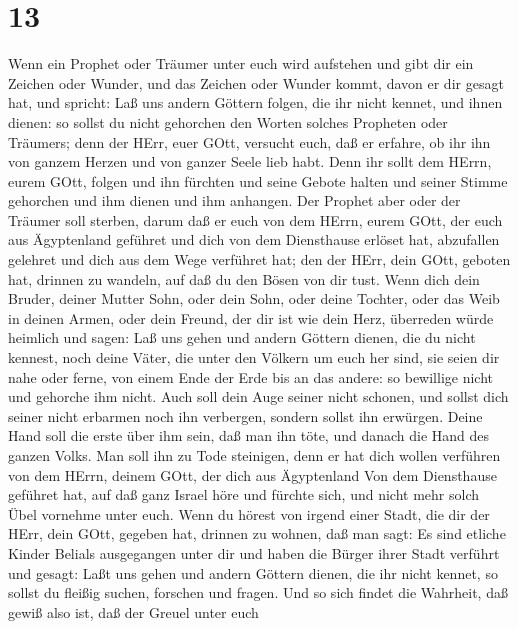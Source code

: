 \hypertarget{section-12}{%
\section{13}\label{section-12}}

 Wenn ein Prophet oder Träumer unter euch wird aufstehen und
gibt dir ein Zeichen oder Wunder,  und das Zeichen oder
Wunder kommt, davon er dir gesagt hat, und spricht: Laß uns andern
Göttern folgen, die ihr nicht kennet, und ihnen dienen:  so
sollst du nicht gehorchen den Worten solches Propheten oder Träumers;
denn der HErr, euer GOtt, versucht euch, daß er erfahre, ob ihr ihn von
ganzem Herzen und von ganzer Seele lieb habt.  Denn ihr
sollt dem HErrn, eurem GOtt, folgen und ihn fürchten und seine Gebote
halten und seiner Stimme gehorchen und ihm dienen und ihm anhangen.
 Der Prophet aber oder der Träumer soll sterben, darum daß
er euch von dem HErrn, eurem GOtt, der euch aus Ägyptenland geführet und
dich von dem Diensthause erlöset hat, abzufallen gelehret und dich aus
dem Wege verführet hat; den der HErr, dein GOtt, geboten hat, drinnen zu
wandeln, auf daß du den Bösen von dir tust.  Wenn dich dein
Bruder, deiner Mutter Sohn, oder dein Sohn, oder deine Tochter, oder das
Weib in deinen Armen, oder dein Freund, der dir ist wie dein Herz,
überreden würde heimlich und sagen: Laß uns gehen und andern Göttern
dienen, die du nicht kennest, noch deine Väter,  die unter
den Völkern um euch her sind, sie seien dir nahe oder ferne, von einem
Ende der Erde bis an das andere:  so bewillige nicht und
gehorche ihm nicht. Auch soll dein Auge seiner nicht schonen, und sollst
dich seiner nicht erbarmen noch ihn verbergen,  sondern
sollst ihn erwürgen. Deine Hand soll die erste über ihm sein, daß man
ihn töte, und danach die Hand des ganzen Volks.  Man soll
ihn zu Tode steinigen, denn er hat dich wollen verführen von dem HErrn,
deinem GOtt, der dich aus Ägyptenland Von dem Diensthause geführet hat,
 auf daß ganz Israel höre und fürchte sich, und nicht mehr
solch Übel vornehme unter euch.  Wenn du hörest von irgend
einer Stadt, die dir der HErr, dein GOtt, gegeben hat, drinnen zu
wohnen, daß man sagt:  Es sind etliche Kinder Belials
ausgegangen unter dir und haben die Bürger ihrer Stadt verführt und
gesagt: Laßt uns gehen und andern Göttern dienen, die ihr nicht kennet,
 so sollst du fleißig suchen, forschen und fragen. Und so
sich findet die Wahrheit, daß gewiß also ist, daß der Greuel unter euch
